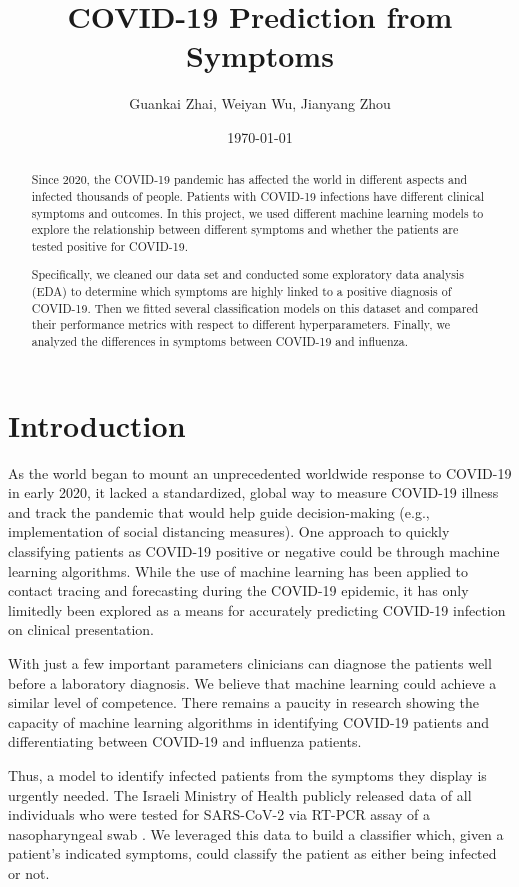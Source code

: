 \documentclass[a4paper, 11pt]{article}
\title{\vspace{-1cm}COVID-19 Prediction from Symptoms}
\author{Guankai Zhai, Weiyan Wu, Jianyang Zhou}
\date{\today} %
\begin{document}
\maketitle

\begin{abstract}
Since 2020, the COVID-19 pandemic has affected the world in different aspects and infected thousands of people. Patients with COVID-19 infections have different clinical symptoms and outcomes. In this project, we used different machine learning models to explore the relationship between different symptoms and whether the patients are tested positive for COVID-19. \par
Specifically, we cleaned our data set and conducted some exploratory data analysis (EDA) to determine which symptoms are highly linked to a positive diagnosis of COVID-19. Then we fitted several classification models on this dataset and compared their performance metrics with respect to different hyperparameters. Finally, we analyzed the differences in symptoms between COVID-19 and influenza. 



\end{abstract}
\section*{Introduction}
As the world began to mount an unprecedented worldwide response to COVID-19 in early 2020, it lacked a standardized, global way to measure COVID-19 illness and track the pandemic that would help guide decision-making (e.g., implementation of social distancing measures). One approach to quickly classifying patients as COVID-19 positive or negative could be through machine learning algorithms. While the use of machine learning has been applied to contact tracing and forecasting during the COVID-19 epidemic, it has only limitedly been explored as a means for accurately predicting COVID-19 infection on clinical presentation. \par 

With just a few important parameters clinicians can diagnose the patients well before a laboratory diagnosis. We believe that machine learning could achieve a similar level of competence. There remains a paucity in research showing the capacity of machine learning algorithms in identifying COVID-19 patients and differentiating between COVID-19 and influenza patients. \par

Thus, a model to identify infected patients from the symptoms they display is urgently needed. The Israeli Ministry of Health publicly released data of all individuals who were tested for SARS-CoV-2 via RT-PCR assay of a nasopharyngeal swab \cite{data}. We leveraged this data to build a classifier which, given a patient's indicated symptoms, could classify the patient as either being infected or not.
\end{document}
